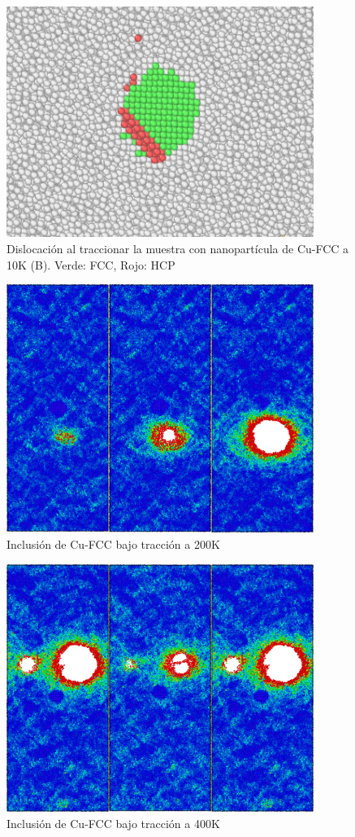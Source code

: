 \documentclass[10pt, oneside]{article} %
\begin{document}
\begin{figure}[H]
\centering
\includegraphics[width=10cm]{Figures/NanoParticles/cuSphereTension_10K_Snapshot_670_Macla_B.png}
\caption{Dislocación al traccionar la muestra con nanopartícula de Cu-FCC a 10K (B). Verde: FCC, Rojo: HCP}
\end{figure}

\begin{figure}[H]
\centering
\includegraphics[width=10cm]{Figures/NanoParticles/Snapshots/cuSphereTension_200K_Snapshots.png}
\caption{Inclusión de Cu-FCC bajo tracción a 200K}
\end{figure}

\begin{figure}[H]
\centering
\includegraphics[width=10cm]{Figures/NanoParticles/Snapshots/cuSphereTension_400K_Snapshots.png}
\caption{Inclusión de Cu-FCC bajo tracción a 400K}
\end{figure}
\end{document}
